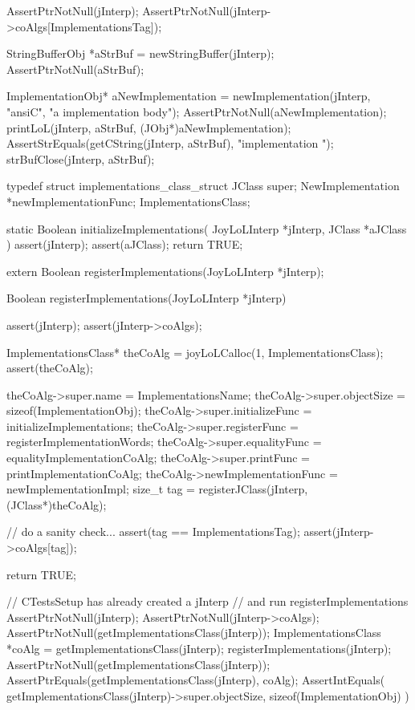 
\startCTest
  AssertPtrNotNull(jInterp);
  AssertPtrNotNull(jInterp->coAlgs[ImplementationsTag]);

  StringBufferObj *aStrBuf = newStringBuffer(jInterp);
  AssertPtrNotNull(aStrBuf);
  
  ImplementationObj* aNewImplementation =
    newImplementation(jInterp, "ansiC", "a implementation body");
  AssertPtrNotNull(aNewImplementation);
  printLoL(jInterp, aStrBuf, (JObj*)aNewImplementation);
  AssertStrEquals(getCString(jInterp, aStrBuf), "implementation ");
  strBufClose(jInterp, aStrBuf);
\stopCTest
\stopTestCase
\stopTestSuite

\startTestSuite[registerImplementations]

\startCHeader
typedef struct implementations_class_struct {
  JClass       super;
  NewImplementation      *newImplementationFunc;
} ImplementationsClass;

\stopCHeader

\startCCode
static Boolean initializeImplementations(
  JoyLoLInterp *jInterp,
  JClass   *aJClass
) {
  assert(jInterp);
  assert(aJClass);
  return TRUE;
}
\stopCCode

\startCHeader
extern Boolean registerImplementations(JoyLoLInterp *jInterp);
\stopCHeader
{}

\startCCode
Boolean registerImplementations(JoyLoLInterp *jInterp) {
  assert(jInterp);
  assert(jInterp->coAlgs);
  
  ImplementationsClass* theCoAlg
    = joyLoLCalloc(1, ImplementationsClass);
  assert(theCoAlg);
  
  theCoAlg->super.name           = ImplementationsName;
  theCoAlg->super.objectSize     = sizeof(ImplementationObj);
  theCoAlg->super.initializeFunc = initializeImplementations;
  theCoAlg->super.registerFunc   = registerImplementationWords;
  theCoAlg->super.equalityFunc   = equalityImplementationCoAlg;
  theCoAlg->super.printFunc      = printImplementationCoAlg;
  theCoAlg->newImplementationFunc = newImplementationImpl;
  size_t tag =
    registerJClass(jInterp, (JClass*)theCoAlg);
  
  // do a sanity check...
  assert(tag == ImplementationsTag);
  assert(jInterp->coAlgs[tag]);
   
  return TRUE;
}
\stopCCode


\startCTest
  // CTestsSetup has already created a jInterp
  // and run registerImplementations
  AssertPtrNotNull(jInterp);
  AssertPtrNotNull(jInterp->coAlgs);
  AssertPtrNotNull(getImplementationsClass(jInterp));
  ImplementationsClass *coAlg = getImplementationsClass(jInterp);
  registerImplementations(jInterp);
  AssertPtrNotNull(getImplementationsClass(jInterp));
  AssertPtrEquals(getImplementationsClass(jInterp), coAlg);
  AssertIntEquals(
    getImplementationsClass(jInterp)->super.objectSize,
    sizeof(ImplementationObj)
  )
\stopCTest
\stopTestCase
\stopTestSuite
